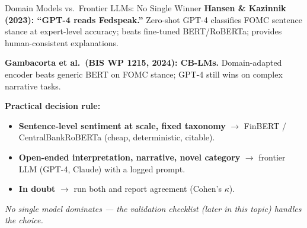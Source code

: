 \begin{frame}{Domain Models vs.\ Frontier LLMs: No Single Winner}
\textbf{Hansen \& Kazinnik (2023): ``GPT-4 reads Fedspeak.''} Zero-shot GPT-4 classifies FOMC sentence stance at expert-level accuracy; beats fine-tuned BERT/RoBERTa; provides human-consistent explanations.

\smallskip
\textbf{Gambacorta et al.\ (BIS WP 1215, 2024): CB-LMs.} Domain-adapted encoder beats generic BERT on FOMC stance; GPT-4 still wins on complex narrative tasks.

\smallskip
\textbf{Practical decision rule:}
\begin{itemize}\itemsep1pt
  \item \textbf{Sentence-level sentiment at scale, fixed taxonomy} $\to$ FinBERT / CentralBankRoBERTa (cheap, deterministic, citable).
  \item \textbf{Open-ended interpretation, narrative, novel category} $\to$ frontier LLM (GPT-4, Claude) with a logged prompt.
  \item \textbf{In doubt} $\to$ run both and report agreement (Cohen's $\kappa$).
\end{itemize}

\smallskip
\textit{No single model dominates --- the validation checklist (later in this topic) handles the choice.}
\end{frame}

